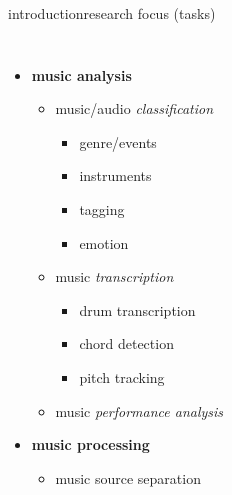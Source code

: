 \begin{frame}{introduction}{research focus (tasks)}
    \vspace{-9mm}
    \begin{columns}
    \begin{itemize}
        \item   \textbf{music analysis} 
            \begin{itemize}
                \item   music/audio \textit{classification}
                    \begin{itemize}
                        \item genre/events \cite{burred_hierarchical_2004, hung_low-resource_2023}
                        \item instruments \cite{gururani_semi-supervised_2021, chen_music_2023, ding_audio_2023}
                        \item tagging \cite{ding_audio_2023, ding_embedding_2024, ma_music_2024}
                        \item emotion \cite{watcharasupat_uncertainty_2025}
                    \end{itemize}
                \item   music \textit{transcription}
                    \begin{itemize}
                        \item drum transcription \cite{wu_review_2018}
                        \item chord detection \cite{zhou_chord_2015}
                        \item pitch tracking \cite{lerch_introduction_2023}
                    \end{itemize}
                \item   music \textit{performance analysis} \cite{lerch_software-based_2009, pati_assessment_2018}
            \end{itemize}
         \smallskip
         \item<2->  \textbf{music processing}
            \begin{itemize}
                \item   music source separation \cite{hung_multi-task_2020, watcharasupat_generalized_2024, watcharasupat_stem-agnostic_2024}
            \end{itemize}
         \smallskip

\end{itemize}
\end{columns}
\end{frame}
